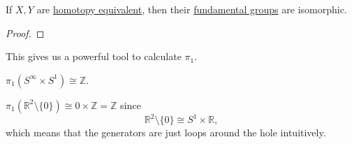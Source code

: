 \begin{theorem}\label{thm:fundamental-group-is-a-homotopy-invariant}
	If \(X, Y\) are \hyperref[def:homotopy-equivalence]{homotopy equivalent}, then their \hyperref[def:fundamental-group]{fundamental groups} are isomorphic.
\end{theorem}
\begin{proof}
\end{proof}

\begin{remark}
	This gives us a powerful tool to calculate \(\pi _1\).
\end{remark}

\begin{eg}
	\(\pi _1(S^{\infty }\times S^1) \cong \mathbb{Z} \).
\end{eg}
\begin{eg}
	\(\pi _1(\mathbb{R} ^2\setminus \{0\}) \cong 0\times \mathbb{Z} = \mathbb{Z}\) since
	\[
		\mathbb{R} ^2\setminus \{0\}\cong S^{1}\times \mathbb{R},
	\]
	which means that the generators are just loops around the hole intuitively.
\end{eg}

